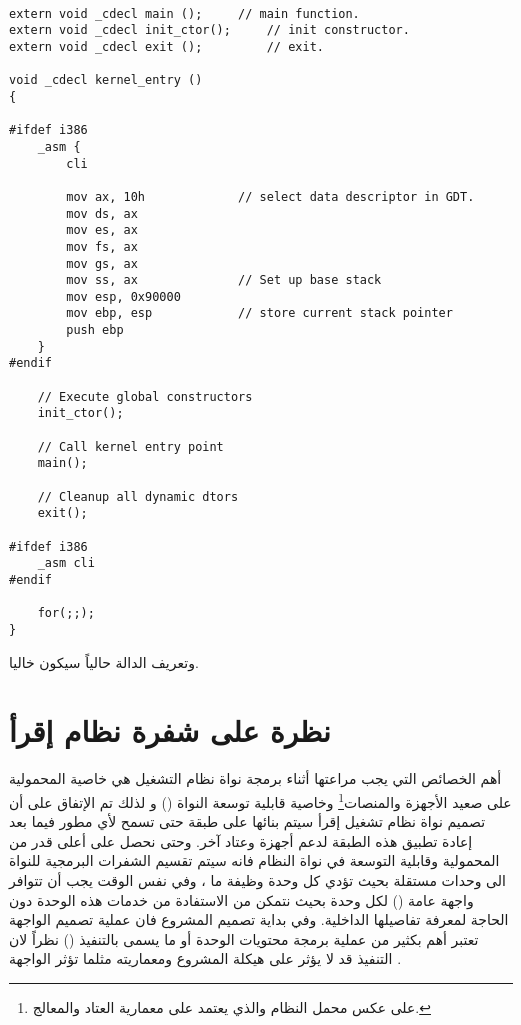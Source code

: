 \documentclass[document.tex]{subfiles}
\begin{document}

\begin{english}

\lstset{numberstyle=\tiny,numbersep=5pt,tabsize=2,extendedchars=true,breaklines=true,frame=b,showspaces=false, showtabs=false,xleftmargin=10pt,framexleftmargin=10pt,framexrightmargin=5pt,framexbottommargin=4pt,showstringspaces=false,language=C++}

\begin{lstlisting}[label=newdelete,caption=Global new/delete operator]

extern void _cdecl main ();		// main function.
extern void _cdecl init_ctor();		// init constructor.
extern void _cdecl exit ();  		// exit.

void _cdecl kernel_entry ()
{

#ifdef i386
	_asm {
		cli						
		
		mov ax, 10h				// select data descriptor in GDT.
		mov ds, ax
		mov es, ax
		mov fs, ax
		mov gs, ax
		mov ss, ax				// Set up base stack
		mov esp, 0x90000
		mov ebp, esp			// store current stack pointer
		push ebp
	}
#endif

	// Execute global constructors
	init_ctor();

	// Call kernel entry point
	main();

	// Cleanup all dynamic dtors
	exit();

#ifdef i386
	_asm cli
#endif

	for(;;);
}
\end{lstlisting}
\end{english}

وتعريف الدالة  حالياً سيكون خاليا.

\section{نظرة على شفرة نظام إقرأ}
أهم الخصائص التي يجب مراعتها أثناء برمجة نواة نظام التشغيل هي خاصية المحمولية على صعيد الأجهزة والمنصات\footnote{على عكس محمل النظام  والذي يعتمد على معمارية العتاد والمعالج.} وخاصية قابلية توسعة النواة () و لذلك تم الإتفاق على أن تصميم نواة نظام تشغيل إقرأ سيتم بنائها على طبقة  حتى تسمح لأي مطور فيما بعد إعادة تطبيق هذه الطبقة لدعم أجهزة وعتاد آخر. وحتى نحصل على أعلى قدر من المحمولية وقابلية التوسعة في نواة النظام فانه سيتم تقسيم الشفرات البرمجية للنواة الى وحدات مستقلة بحيث تؤدي كل وحدة وظيفة ما ، وفي نفس الوقت يجب أن تتوافر واجهة عامة () لكل وحدة بحيث نتمكن من الاستفادة من خدمات هذه الوحدة دون الحاجة لمعرفة تفاصيلها الداخلية. وفي بداية تصميم المشروع فان عملية تصميم الواجهة تعتبر أهم بكثير من عملية برمجة محتويات الوحدة أو ما يسمى بالتنفيذ () نظراً لان التنفيذ قد لا يؤثر على هيكلة المشروع ومعماريته مثلما تؤثر الواجهة .
\end{document}
